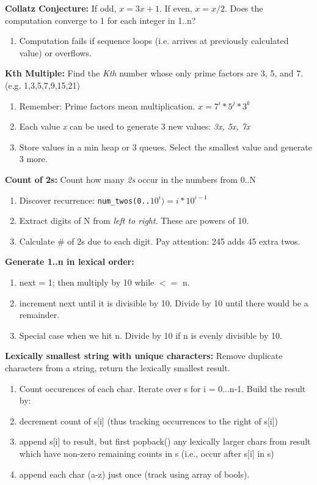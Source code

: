 \documentclass[12pt]{article}
\begin{document}
\vspace{5mm}
\noindent
\textbf{Collatz Conjecture:}
If odd, $x = 3x + 1$. If even, $x  = x / 2$. Does the computation converge to 1 for each integer in 1..n?
\begin{enumerate}
\item Computation fails if sequence loops (i.e. arrives at previously calculated value) or overflows.
\end{enumerate}


\vspace{5mm}
\noindent
\textbf{Kth Multiple:}
Find the \emph{Kth} number whose only prime factors are 3, 5, and 7. (e.g. 1,3,5,7,9,15,21)
\begin{enumerate}
\item Remember: Prime factors mean multiplication. $x = 7^i * 5^j * 3^k$
\item Each value \emph{x} can be used to generate 3 new values: \emph{3x, 5x, 7x}
\item Store values in a min heap or 3 queues. Select the smallest value and generate 3 more.
\end{enumerate}


\vspace{5mm}
\noindent
\textbf{Count of 2s:}
Count how many \emph{2s} occur in the numbers from 0..N
\begin{enumerate}
\item Discover recurrence: \texttt{num\_twos(0..$10^i) = i*10^{i-1}$}
\item Extract digits of N from \emph{left to right}. These are powers of 10.
\item Calculate \# of 2s due to each digit. Pay attention: 245 adds 45 extra twos.
\end{enumerate}


\vspace{5mm}
\noindent
\textbf{Generate 1..n in lexical order:}
\begin{enumerate}
\item next = 1; then multiply by 10 while $<=$ n. 
\item increment next until it is divisible by 10. Divide by 10 until there would be a remainder.
\item Special case when we hit n. Divide by 10 if n is evenly divisible by 10.
\end{enumerate}


\vspace{5mm}
\noindent
\textbf{Lexically smallest string with unique characters:}
Remove duplicate characters from a string, return the lexically smallest result.
\begin{enumerate}
\item Count occurences of each char. Iterate over s for i = 0...n-1. Build the result by:
\item decrement count of s[i] (thus tracking occurrences to the right of s[i])
\item append s[i] to result, but first popback() any lexically larger chars from result which have non-zero remaining counts in s (i.e., occur after s[i] in s)
\item append each char (a-z) just once (track using array of bools).
\end{enumerate}
\end{document}
